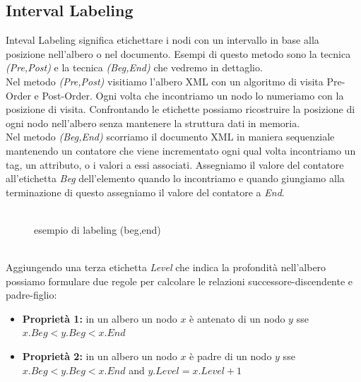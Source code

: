 \subsection{Interval Labeling}
Inteval Labeling significa etichettare i nodi con un intervallo in base alla posizione nell'albero o nel documento. Esempi di questo metodo sono la tecnica \emph{(Pre,Post)} e la tecnica \emph{(Beg,End)} che vedremo in dettaglio.
\\
Nel metodo \emph{(Pre,Post)} visitiamo l'albero XML con un algoritmo di visita Pre-Order e Post-Order. Ogni volta che incontriamo un nodo lo numeriamo con la posizione di visita. Confrontando le etichette possiamo ricostruire la posizione di ogni nodo nell'albero senza mantenere la struttura dati in memoria.
\\
Nel metodo \emph{(Beg,End)} scorriamo il documento XML in maniera sequenziale mantenendo un contatore che viene incrementato ogni qual volta incontriamo un tag, un attributo, o i valori a essi associati. Assegniamo il valore del contatore all'etichetta \emph{Beg} dell'elemento quando lo incontriamo e quando giungiamo alla terminazione di questo assegniamo il valore del contatore a \emph{End}.
\\\\
\begin{example}
\begin{figure}[h]
\centering
{}
\caption{esempio di labeling (beg,end)}
\end{figure}
\end{example}
\\
Aggiungendo una terza etichetta \emph{Level} che indica la profondità nell'albero possiamo formulare due regole per calcolare le relazioni successore-discendente e padre-figlio:
\begin{itemize}
\item \textbf{Proprietà 1:} in un albero un nodo $x$ è antenato di un nodo $y$ sse $x.Beg < y.Beg < x.End$
\item \textbf{Proprietà 2:} in un albero un nodo $x$ è padre di un nodo $y$ sse $x.Beg < y.Beg < x.End$ and $y.Level = x.Level + 1$
\end{itemize}


